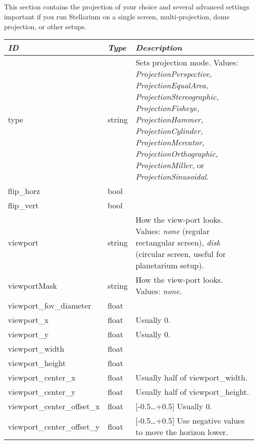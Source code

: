 \subsection{}

This section contains the projection of your choice and several
advanced settings important if you run Stellarium on a single screen,
multi-projection, dome projection, or other setups.

\begin{longtable}{l|l|p{80mm}}\toprule
\emph{ID} & \emph{Type} & \emph{Description}\\\midrule
type                       & string & Sets projection mode. Values: \emph{ProjectionPerspective,
                                      ProjectionEqualArea, ProjectionStereographic, ProjectionFisheye,
                                      ProjectionHammer, ProjectionCylinder, ProjectionMercator,
                                      ProjectionOrthographic, ProjectionMiller}, or \emph{ProjectionSinusoidal}.\\%
flip\_horz                   & bool & \\%
flip\_vert                   & bool & \\%
viewport                   & string & How the view-port looks. Values: \emph{none} (regular rectangular screen), 
                                      \emph{disk} (circular screen, useful for planetarium setup).\\%
viewportMask               & string & How the view-port looks. Values: \emph{none}.\\%
viewport\_fov\_diameter     & float & \\%
viewport\_x                 & float & Usually 0. \\%
viewport\_y                 & float & Usually 0. \\%
viewport\_width             & float & \\%
viewport\_height            & float & \\%
viewport\_center\_x         & float & Usually half of viewport\_width. \\%
viewport\_center\_y         & float & Usually half of viewport\_height. \\%
viewport\_center\_offset\_x & float & [-0.5\ldots+0.5] Usually 0. \\%
viewport\_center\_offset\_y & float & [-0.5\ldots+0.5] Use negative values to move the horizon lower. \\
\bottomrule
\end{longtable}

